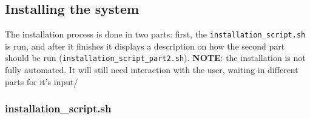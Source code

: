 \documentclass{article}
\begin{document}
\subsection{Installing the system}

The installation process is done in two parts: first, the \texttt{installation\_script.sh} is run, and after it finishes it displays a description on how the second part should be run (\texttt{installation\_script\_part2.sh}).
\newline
\newline
\textbf{NOTE}: the installation is not fully automated. It will still need interaction with the user, waiting in different parts for it's input/ 
\subsubsection{installation\_script.sh}
\end{document}
